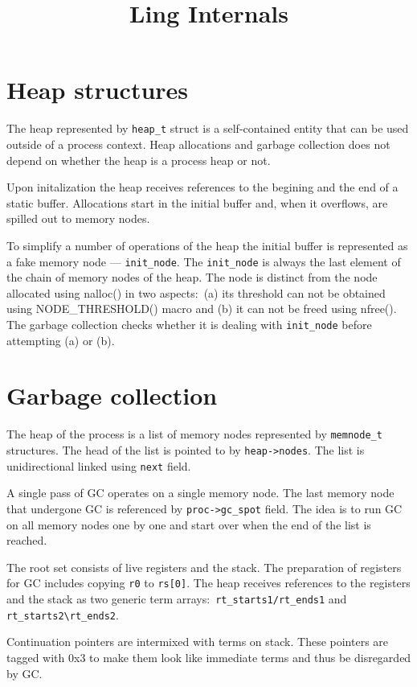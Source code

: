 \documentclass{article}
\title{Ling Internals}
\begin{document}
\maketitle

\section{Heap structures\label{sec:heap}}

The heap represented by \verb$heap_t$ struct is a self-contained entity that can
be used outside of a process context. Heap allocations and garbage collection
does not depend on whether the heap is a process heap or not.

Upon initalization the heap receives references to the begining and the end of a
static buffer. Allocations start in the initial buffer and, when it overflows,
are spilled out to memory nodes.

To simplify a number of operations of the heap the initial buffer is represented
as a fake memory node --- \verb$init_node$. The \verb$init_node$ is always the
last element of the chain of memory nodes of the heap. The node is distinct from
the node allocated using nalloc() in two aspects$:$ (a) its threshold can not be
obtained using NODE\_THRESHOLD() macro and (b) it can not be freed using nfree().
The garbage collection checks whether it is dealing with \verb$init_node$ before
attempting (a) or (b).

\section{Garbage collection}

The heap of the process is a list of memory nodes represented by
\verb$memnode_t$ structures. The head of the list is pointed to by
\verb$heap->nodes$. The list is unidirectional linked using \verb$next$
field.

A single pass of GC operates on a single memory node. The last memory node that
undergone GC is referenced by \verb$proc->gc_spot$ field. The idea is to run
GC on all memory nodes one by one and start over when the end of the list is
reached.

The root set consists of live registers and the stack. The preparation of
registers for GC includes copying \verb$r0$ to \verb$rs[0]$. The heap receives
references to the registers and the stack as two generic term arrays$:$
\verb$rt_starts1/rt_ends1$ and \verb$rt_starts2\rt_ends2$.

Continuation pointers are intermixed with terms on stack. These pointers are
tagged with 0x3 to make them look like immediate terms and thus be disregarded
by GC.
 
\end{document}
